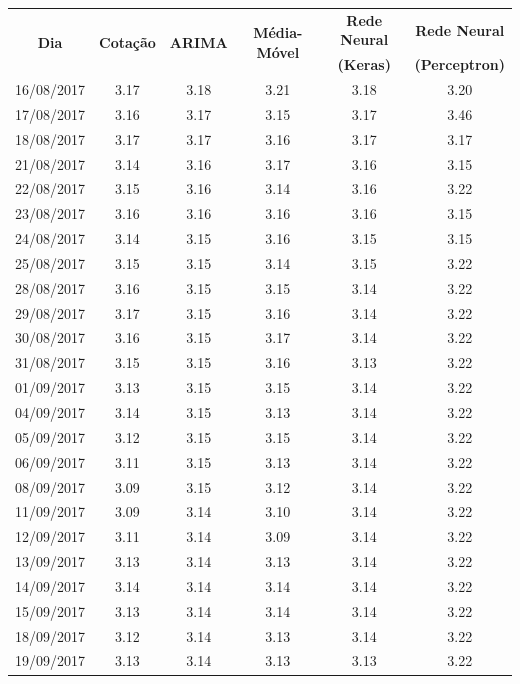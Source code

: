 \begin{table}[]
\begin{center}
\begin{tabular}{|c|c|c|c|c|c|}
\hline
\multirow{2}{*}{\textbf{Dia}} & \multirow{2}{*}{\textbf{Cotação}} 
& \multirow{2}{*}{\textbf{ARIMA}} & \multirow{2}{*}{\textbf{Média-Móvel}}
& \textbf{Rede Neural} & \textbf{Rede Neural} \\
&&&& \textbf{(Keras)} & \textbf{(Perceptron)} \\
\hline
\hline
16/08/2017 & 3.17 & 3.18 & 3.21 & 3.18 & 3.20 \\
17/08/2017 & 3.16 & 3.17 & 3.15 & 3.17 & 3.46 \\
18/08/2017 & 3.17 & 3.17 & 3.16 & 3.17 & 3.17 \\
21/08/2017 & 3.14 & 3.16 & 3.17 & 3.16 & 3.15 \\
22/08/2017 & 3.15 & 3.16 & 3.14 & 3.16 & 3.22 \\
23/08/2017 & 3.16 & 3.16 & 3.16 & 3.16 & 3.15 \\
24/08/2017 & 3.14 & 3.15 & 3.16 & 3.15 & 3.15 \\
25/08/2017 & 3.15 & 3.15 & 3.14 & 3.15 & 3.22 \\
28/08/2017 & 3.16 & 3.15 & 3.15 & 3.14 & 3.22 \\
29/08/2017 & 3.17 & 3.15 & 3.16 & 3.14 & 3.22 \\
30/08/2017 & 3.16 & 3.15 & 3.17 & 3.14 & 3.22 \\
31/08/2017 & 3.15 & 3.15 & 3.16 & 3.13 & 3.22 \\
01/09/2017 & 3.13 & 3.15 & 3.15 & 3.14 & 3.22 \\
04/09/2017 & 3.14 & 3.15 & 3.13 & 3.14 & 3.22 \\
05/09/2017 & 3.12 & 3.15 & 3.15 & 3.14 & 3.22 \\
06/09/2017 & 3.11 & 3.15 & 3.13 & 3.14 & 3.22 \\
08/09/2017 & 3.09 & 3.15 & 3.12 & 3.14 & 3.22 \\
11/09/2017 & 3.09 & 3.14 & 3.10 & 3.14 & 3.22 \\
12/09/2017 & 3.11 & 3.14 & 3.09 & 3.14 & 3.22 \\
13/09/2017 & 3.13 & 3.14 & 3.13 & 3.14 & 3.22 \\
14/09/2017 & 3.14 & 3.14 & 3.14 & 3.14 & 3.22 \\
15/09/2017 & 3.13 & 3.14 & 3.14 & 3.14 & 3.22 \\
18/09/2017 & 3.12 & 3.14 & 3.13 & 3.14 & 3.22 \\
19/09/2017 & 3.13 & 3.14 & 3.13 & 3.13 & 3.22 \\

\end{tabular}
\end{center}
\end{table}
